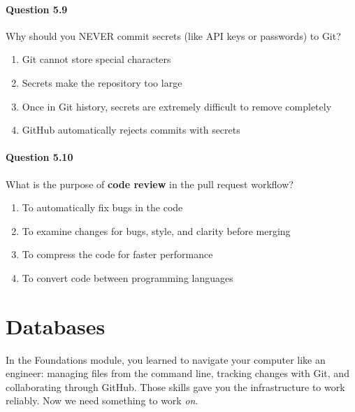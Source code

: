 \documentclass[
  letterpaper,
  DIV=11,
  numbers=noendperiod]{scrreprt}
\providecommand{\tightlist}{%
  \setlength{\itemsep}{0pt}\setlength{\parskip}{0pt}}
\begin{document}
\subsection{Question 5.9}\label{question-5.9}

Why should you NEVER commit secrets (like API keys or passwords) to Git?

\begin{enumerate}
\def\labelenumi{\Alph{enumi})}
\tightlist
\item
  Git cannot store special characters\\
\item
  Secrets make the repository too large\\
\item
  Once in Git history, secrets are extremely difficult to remove
  completely\\
\item
  GitHub automatically rejects commits with secrets
\end{enumerate}

\subsection{Question 5.10}\label{question-5.10}

What is the purpose of \textbf{code review} in the pull request
workflow?

\begin{enumerate}
\def\labelenumi{\Alph{enumi})}
\tightlist
\item
  To automatically fix bugs in the code\\
\item
  To examine changes for bugs, style, and clarity before merging\\
\item
  To compress the code for faster performance\\
\item
  To convert code between programming languages
\end{enumerate}

\part{Databases}

In the Foundations module, you learned to navigate your computer like an
engineer: managing files from the command line, tracking changes with
Git, and collaborating through GitHub. Those skills gave you the
infrastructure to work reliably. Now we need something to work
\emph{on}.
\end{document}
